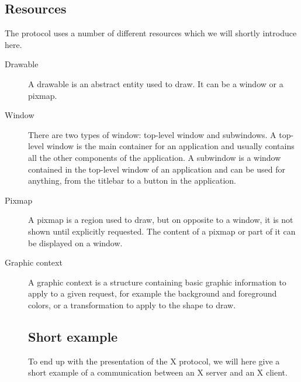 \subsection{Resources}
The protocol uses a number of different resources which we will shortly 
introduce here.
\begin{description}
\item[Drawable] A drawable is an abstract entity used to draw. It can be a window or a pixmap.
\item[Window] There are two types of window: top-level window and subwindows. 
  A top-level window is the main container for an application and 
  usually contains all the other components of the application.
  A subwindow is a window contained in the top-level window of an application 
  and can be used for anything, from the titlebar to a button in the application.
\item[Pixmap] A pixmap is a region used to draw, but on opposite to a window, 
  it is not shown until explicitly requested. The content of a pixmap 
  or part of it can be displayed on a window.
\item[Graphic context] A graphic context is a structure containing basic graphic 
  information to apply to a given request, for example the background and 
  foreground colors, or a transformation to apply to the shape to draw.
\subsection{Short example}
To end up with the presentation of the X protocol, we will here give a
short example of a communication between an X server and an X client.
\end{description}
